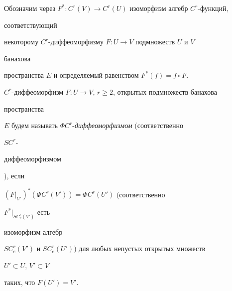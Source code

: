 Обозначим через $F^*:C^r(V)\to C^r(U)$ изоморфизм алгебр $C^r$-функций,


соответствующий


некоторому $C^r$-диффеоморфизму $F:U\to V$ подмножеств $U$ и $V$


банахова


пространства $E$ и определяемый равенством $F^*(f)=f\circ F$.





\begin{defns}


$C^r$-диффеоморфизм $F:U\to V$, $r\ge 2$, открытых подмножеств банахова


пространства


$E$ будем называть $\Phi C^r$-{\em диффеоморфизмом} (соответственно


$SC^r$-{\em


диффеоморфиз\-мом}), если


$(F|_{U'})^*(\Phi C^r(V'))=\Phi C^r(U')$ (соответственно


$F^*|_{SC^r_e(V')}$ есть


изоморфизм алгебр


$SC^r_e(V')$ и $SC^r_e(U')$) для любых непустых открытых множеств


$U'\subset U$, $V'\subset V$


таких, что $F(U')=V'$.


\end{defns}





